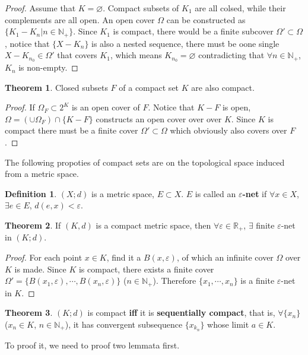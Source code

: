 \documentclass{article}
\theoremstyle{plain}
\theoremstyle{definition}
\newtheorem{dfn}{Definition}[section] %
\newtheorem{thrm}{Theorem}[section] %
\begin{document}
\begin{proof}
	Assume that $K=\varnothing$. Compact subsets of $K_1$ are all colsed, while their complements are all open. An open cover $\Omega$ can be constructed as $\{K_1-K_n|n\in\mathbb{N}_+\}$. Since $K_1$ is compact, there would be a finite subcover $\Omega'\subset\Omega$, notice that $\{X-K_n\}$ is also a nested sequence, there must be oone single $X-K_{n_0}\in\Omega'$ that covers $K_1$, which means $K_{n_0}=\varnothing$ contradicting that $\forall n\in\mathbb{N}_+$, $K_n$ is non-empty.
\end{proof}
\begin{thrm}\label{compact_closed_subset}
Closed subsets $F$ of a compact set $K$ are also compact.
\end{thrm}
\begin{proof}
	If $\Omega_F\subset 2^K$ is an open cover of $F$. Notice that $K - F$ is open, $\Omega=\left(\cup\Omega_F\right)\cap\{K-F\}$ constructs an open cover over over $K$. Since $K$ is compact there must be a finite cover $\Omega'\subset\Omega$ which obviously also covers over $F$.
\end{proof}
The following propoties of compact sets are on the topological space induced from a metric space.
\begin{dfn}\label{e-net}
	$(X;d)$ is a metric space, $E\subset X$. $E$ is called an \textbf{$\varepsilon$-net} if $\forall x\in X$,$\exists e\in E$, $d(e,x)<\varepsilon$.
\end{dfn}
\begin{thrm}\label{finite_e-net}
If $(K,d)$ is a compact metric space, then $\forall \varepsilon\in\mathbb{R}_+$, $\exists$ finite $\varepsilon$-net in $(K;d)$. 
\end{thrm}
\begin{proof}
	For each point $x\in K$, find it a $B(x,\varepsilon)$, of which an infinite cover $\Omega$ over $K$ is made. Since $K$ is compact, there exists a finite cover $\Omega'=\{B(x_1,\varepsilon),\cdots,B(x_n,\varepsilon)\}$ ($n\in\mathbb{N}_+$). Therefore $\{x_1,\cdots,x_n\}$ is a finite $\varepsilon$-net in $K$.
\end{proof}
\begin{thrm}\label{sequentially_compact_metric}
$(K;d)$ is compact \textbf{iff} it is \textbf{sequentially compact}, that is, $\forall \{x_n\}$ ($x_n\in K$, $n\in\mathbb{N}_+$), it has convergent subsequence $\{x_{k_n}\}$ whose limit $a\in K$.
\end{thrm}
To proof it, we need to proof two lemmata first.
\end{document}
